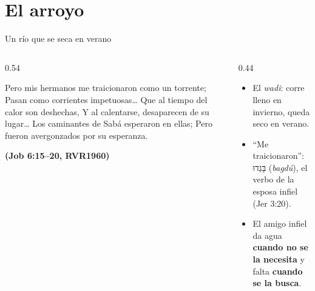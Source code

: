 \documentclass[hyperref={bookmarks=false},aspectratio=169]{beamer}
\newcommand{\heb}[1]{\mbox{\foreignlanguage{hebrew}{#1}}}
\newcommand{\fuente}[1]{\par\hfill{\upshape\bfseries\footnotesize\textcolor{azul}{#1}}}
\newcommand{\destacar}[1]{\textbf{\textcolor{azul}{#1}}}
\begin{document}
\section{El arroyo}

\begin{frame}{Un río que se seca en verano}
\begin{columns}[t,onlytextwidth]
\begin{column}{0.54\textwidth}
\begin{cita}Pero mis hermanos me traicionaron como un torrente; Pasan como corrientes impetuosas\ldots{} Que al tiempo del calor son deshechas, Y al calentarse, desaparecen de su lugar\ldots{} Los caminantes de Sabá esperaron en ellas; Pero fueron avergonzados por su esperanza.\fuente{(Job 6:15--20, RVR1960)}\end{cita}
\end{column}
\begin{column}{0.44\textwidth}\small
\begin{itemize}
\item El \emph{wadi}: corre lleno en invierno, queda seco en verano.
\item ``Me traicionaron'': \heb{בָּגְדוּ} (\emph{bagdú}), el verbo de la esposa infiel (Jer 3:20).
\item El amigo infiel da agua \destacar{cuando no se la necesita} y falta \destacar{cuando se la busca}.
\end{itemize}
\end{column}
\end{columns}
\end{frame}
\end{document}
